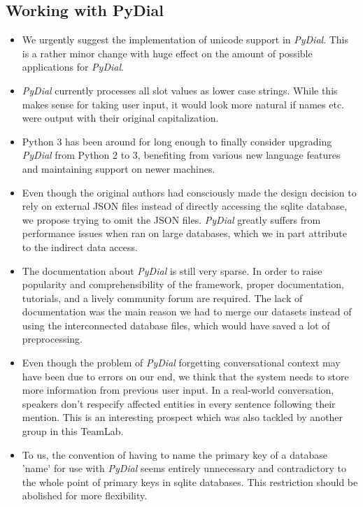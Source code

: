 \documentclass[11pt,a4paper]{article}
\begin{document}
\subsection{Working with PyDial}
\label{sec:conclusions-pydial}
\begin{itemize}
\item We urgently suggest the implementation of unicode support in \textit{PyDial}. This is a rather minor change with huge effect on the amount of possible applications for \textit{PyDial}.
\item \textit{PyDial} currently processes all slot values as lower case strings. While this makes sense for taking user input, it would look more natural if names etc. were output with their original capitalization. 
\item Python 3 has been around for long enough to finally consider upgrading \textit{PyDial} from Python 2 to 3, benefiting from various new language features and maintaining support on newer machines.
\item Even though the original authors had consciously made the design decision to rely on external JSON files instead of directly accessing the sqlite database, we propose trying to omit the JSON files. \textit{PyDial} greatly suffers from performance issues when ran on large databases, which we in part attribute to the indirect data access. 
\item The documentation about \textit{PyDial} is still very sparse. In order to raise popularity and comprehensibility of the framework, proper documentation, tutorials, and a lively community forum are required.
The lack of documentation was the main reason we had to merge our datasets instead of using the interconnected database files, which would have saved a lot of preprocessing.
\item Even though the problem of \textit{PyDial} forgetting conversational context may have been due to errors on our end, we think that the system needs to store more information from previous user input. In a real-world conversation, speakers don't respecify affected entities in every sentence following their mention. This is an interesting prospect which was also tackled by another group in this TeamLab.  
\item To us, the convention of having to name the primary key of a database 'name' for use with \textit{PyDial} seems entirely unnecessary and contradictory to the whole point of primary keys in sqlite databases. This restriction should be abolished for more flexibility.

\end{itemize}
\end{document}
